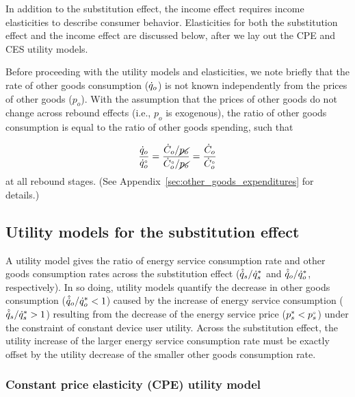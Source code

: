 \documentclass[12pt]{article}\usepackage[]{graphicx}\usepackage[]{xcolor}
\begin{document}
In addition to the substitution effect,
the income effect requires income elasticities
to describe consumer behavior. 
Elasticities for both the substitution effect and the income effect
are discussed below, 
after we lay out the CPE and CES utility models.

Before proceeding with the utility models and elasticities,
we note briefly that the rate of other goods consumption ($\dot{q}_o$)
is not known independently from the prices of other goods ($p_o$).
With the assumption that the prices of other goods do not change
across rebound effects
(i.e., $p_o$ is exogenous), 
the ratio of other goods consumption is equal to 
the ratio of other goods spending, such that

\begin{equation} \label{eq:exogenous_p_o}
  \frac{\dot{q}_o}{{}{\dot{q}}^{\scriptscriptstyle \circ}_o} 
      = \frac{\dot{C}_o/\cancel{p_o}}{{}{\dot{C}}^{\scriptscriptstyle \circ}_o/\cancel{p_o}} 
      = \frac{\dot{C}_o}{{}{\dot{C}}^{\scriptscriptstyle \circ}_o}
\end{equation}
%
at all rebound stages. 
(See Appendix~\ref{sec:other_goods_expenditures} for details.)


\subsection{Utility models for the substitution effect}
\label{sec:utility_models_sub}

A utility model gives the ratio of energy service consumption rate 
and other goods consumption rates across the substitution effect
($\hat{\dot{q}}_s/{\dot{q}}^*_s$ and 
$\hat{\dot{q}}_o/{\dot{q}}^*_o$, 
respectively).
In so doing, 
utility models quantify the decrease in other goods consumption
($\hat{\dot{q}}_o/{\dot{q}}^*_o < 1$)
caused by the increase of energy service consumption
($\hat{\dot{q}}_s/{\dot{q}}^*_s > 1$)
resulting from the decrease of the energy service price (${p}^*_s < {}{p}^{\scriptscriptstyle \circ}_s$)
under the constraint of constant device user utility.
Across the substitution effect, 
the utility increase of the larger energy service consumption rate
must be exactly offset
by the utility decrease of the smaller other goods consumption rate.


\subsubsection{Constant price elasticity (CPE) utility model} 
\label{sec:derivation_cpe_utility_model}
\end{document}
